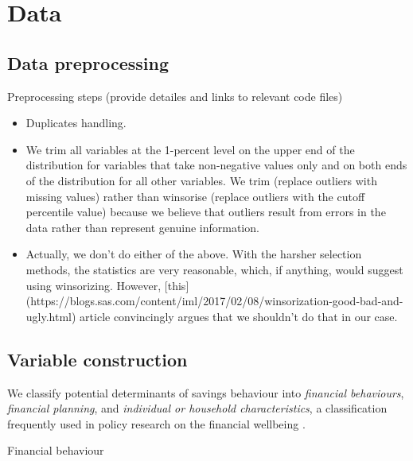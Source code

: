 
\section{Data}%
\label{sec:data}

\subsection{Data preprocessing}%
\label{sub:data_preprocessing}

Preprocessing steps
(provide detailes and links to relevant code files)
\begin{itemize}
    \item Duplicates handling.
    \item We trim all variables at the 1-percent level on the upper end of the
        distribution for variables that take non-negative values only and on
        both ends of the distribution for all other variables. We trim
        (replace outliers with missing values) rather than winsorise (replace
        outliers with the cutoff percentile value) because we believe that
        outliers result from errors in the data rather than represent genuine
        information.
    \item Actually, we don't do either of the above. With the harsher selection
        methods, the statistics are very reasonable, which, if anything, would
        suggest using winsorizing. However,
        [this](https://blogs.sas.com/content/iml/2017/02/08/winsorization-good-bad-and-ugly.html)
        article convincingly argues that we shouldn't do that in our case.
\end{itemize}


\subsection{Variable construction}%
\label{sub:variable_construction}

We classify potential determinants of savings behaviour into \textit{financial behaviours},
\textit{financial planning}, and \textit{individual or household
characteristics}, a classification frequently used in policy research on
the financial wellbeing \citep{can2019improving,cfpb2017financial, mps2018building}.

Financial behaviour

